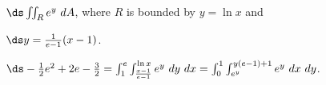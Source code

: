 {$\ds \iint_R e^y\ dA$, where $R$ is bounded by $y=\ln x$ and\par $\ds y=\frac{1}{e-1}(x-1)$.
}
{$\ds -\frac12e^2+2e-\frac32 = \int_{1}^e\int_{\frac{x-1}{e-1}}^{\ln x}e^y\ dy\ dx = \int_{0}^1\int_{e^y}^{y(e-1)+1}e^y\ dx\ dy$.
}